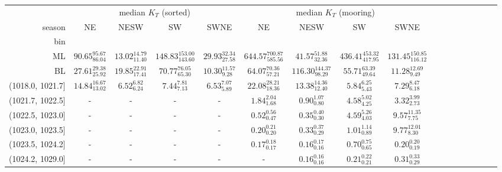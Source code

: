 \begin{tabular}{@{\extracolsep\fill}rcccccccccccccccc}
\toprule
{} & \multicolumn{4}{c}{median $K_T$ (sorted)} & \multicolumn{4}{c}{median $K_T$ (mooring)} \\
season &                       NE &                     NESW &                          SW &                     SWNE &                          NE &                       NESW &                          SW &                        SWNE \\
bin              &                          &                          &                             &                          &                             &                            &                             &                             \\
\midrule
ML               &  $90.65_{86.04}^{95.67}$ &  $13.02_{11.40}^{14.79}$ &  $148.83_{143.60}^{153.00}$ &  $29.93_{27.58}^{32.34}$ &  $644.57_{585.56}^{700.87}$ &    $41.57_{32.36}^{51.88}$ &  $436.41_{417.95}^{453.32}$ &  $131.45_{116.12}^{150.85}$ \\
BL               &  $27.61_{25.92}^{29.38}$ &  $19.85_{17.41}^{22.91}$ &     $70.77_{65.30}^{76.05}$ &   $10.30_{9.28}^{11.57}$ &     $64.07_{57.21}^{70.36}$ &  $116.30_{98.29}^{144.37}$ &     $55.71_{49.64}^{63.39}$ &      $11.28_{9.49}^{12.69}$ \\
(1018.0, 1021.7] &  $14.84_{13.02}^{16.67}$ &     $6.52_{6.24}^{6.82}$ &        $7.44_{7.13}^{7.81}$ &     $6.53_{5.89}^{7.07}$ &     $22.08_{18.36}^{28.21}$ &    $13.38_{12.40}^{14.36}$ &        $5.84_{5.43}^{6.25}$ &        $7.29_{6.18}^{8.47}$ \\
(1021.7, 1022.5] &                        - &                        - &                           - &                        - &        $1.84_{1.68}^{2.04}$ &       $0.90_{0.80}^{1.07}$ &        $4.58_{4.25}^{5.02}$ &        $3.32_{2.73}^{3.99}$ \\
(1022.5, 1023.0] &                        - &                        - &                           - &                        - &        $0.52_{0.47}^{0.56}$ &       $0.35_{0.30}^{0.40}$ &        $4.59_{4.03}^{5.26}$ &       $9.57_{7.75}^{11.35}$ \\
(1023.0, 1023.5] &                        - &                        - &                           - &                        - &        $0.20_{0.20}^{0.21}$ &       $0.33_{0.29}^{0.37}$ &        $1.01_{0.89}^{1.14}$ &       $9.77_{8.30}^{12.01}$ \\
(1023.5, 1024.2] &                        - &                        - &                           - &                        - &        $0.17_{0.17}^{0.18}$ &       $0.16_{0.16}^{0.17}$ &        $0.70_{0.65}^{0.75}$ &        $0.20_{0.19}^{0.20}$ \\
(1024.2, 1029.0] &                        - &                        - &                           - &                        - &        - &       $0.16_{0.16}^{0.16}$ &        $0.21_{0.21}^{0.22}$ &        $0.31_{0.29}^{0.33}$ \\
\bottomrule
\end{tabular}
